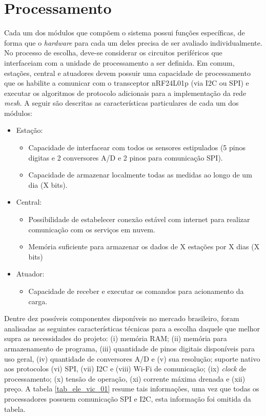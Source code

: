 \section{Processamento}
		
	Cada um dos módulos que compõem o sistema possui funções específicas, de forma que o \emph{hardware} para cada um deles precisa de ser avaliado individualmente. No processo de escolha, deve-se considerar os circuitos periféricos que interfaceiam com a unidade de processamento a ser definida. Em comum, estações, central e atuadores devem possuir uma capacidade de processamento que os habilite a comunicar com o transceptor nRF24L01p (via I2C ou SPI) e executar os algoritmos de protocolo adicionais para a implementação da rede \emph{mesh}. A seguir são descritas as características particulares de cada um dos módulos:

	\begin{itemize}
		\item Estação:
			\begin{itemize}
				\item Capacidade de interfacear com todos os sensores estipulados (5 pinos digitas e 2 conversores A/D e 2 pinos para comunicação SPI).
				\item Capacidade de armazenar localmente todas as medidas ao longo de um dia (X bits).
			\end{itemize}
		\item Central:
			\begin{itemize}
				\item Possibilidade de estabelecer conexão estável com internet para realizar comunicação com os serviços em nuvem. 
				\item Memória suficiente para armazenar os dados de X estações por X dias (X bits)
			\end{itemize}
		\item Atuador:
			\begin{itemize}
				\item Capacidade de receber e executar os comandos para acionamento da carga.
			\end{itemize}
	\end{itemize}

	Dentre dez possíveis componentes disponíveis no mercado brasileiro, foram analisadas as seguintes características técnicas para a escolha daquele que melhor supra as necessidades do projeto: (i) memória RAM; (ii) memória para armazenamento de programa, (iii) quantidade de pinos digitais disponíveis para uso geral, (iv) quantidade de conversores A/D e (v) sua resolução; suporte nativo aos protocolos (vi) SPI, (vii) I2C e (viii) Wi-Fi de comunicação; (ix) \emph{clock} de processamento; (x) tensão de operação, (xi) corrente máxima drenada e (xii) preço. A tabela \ref{tab_ele_vic_01} resume tais informações, uma vez que todas os processadores possuem comunicação SPI e I2C, esta informação foi omitida da tabela.  


